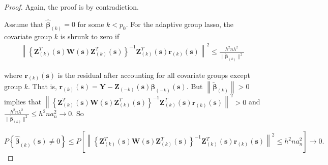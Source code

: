 \documentclass[authoryear, review, 11pt]{elsarticle}
\begin{document}
    \begin{proof}
        Again, the proof is by contradiction.

        Assume that $\hat{\bm{\beta}}_{(k)} = 0$ for some $k<p_0$. For the adaptive group lasso, the covariate group $k$ is shrunk to zero if 
        \begin{align*}
            \left\| \left\{ \bm{Z}_{(k)}^T(\bm{s}) \bm{W}(\bm{s}) \bm{Z}_{(k)}^T(\bm{s}) \right\}^{-1} \bm{Z}_{(k)}^T(\bm{s}) \bm{r}_{(k)}(\bm{s}) \right\|^2 \le \frac{h^2 n \lambda^2}{ \| \tilde{\bm{\beta}}_{(k)} \|^2 } 
        \end{align*}

        where $\bm{r}_{(k)}(\bm{s})$ is the residual after accounting for all covariate groups except group $k$. That is, $\bm{r}_{(k)}(\bm{s}) = \bm{Y} - \bm{Z}_{(-k)}(\bm{s}) \bm{\beta}_{(-k)}(\bm{s})$. But $\left\| \tilde{\bm{\beta}}_{(k)} \right\| > 0$ implies that $ \left\| \left\{ \bm{Z}_{(k)}^T(\bm{s}) \bm{W}(\bm{s}) \bm{Z}_{(k)}^T(\bm{s}) \right\}^{-1} \bm{Z}_{(k)}^T(\bm{s}) \bm{r}_{(k)}(\bm{s}) \right\|^2 > 0$ and $\frac{h^2 n \lambda^2}{ \| \tilde{\bm{\beta}}_{(k)} \|^2 }  \le h^2 n a_n^2 \to 0$. So

        \begin{equation}
            P \left\{ \hat{\bm{\beta}}_{(k)} (\bm{s}) \ne 0 \right\} \le P \left[ \left\| \left\{ \bm{Z}_{(k)}^T(\bm{s}) \bm{W}(\bm{s}) \bm{Z}_{(k)}^T(\bm{s}) \right\}^{-1} \bm{Z}_{(k)}^T(\bm{s}) \bm{r}_{(k)}(\bm{s}) \right\|^2 \le h^2 n a_n^2 \right] \to 0.
        \end{equation}
        
    \end{proof}
\end{document}
